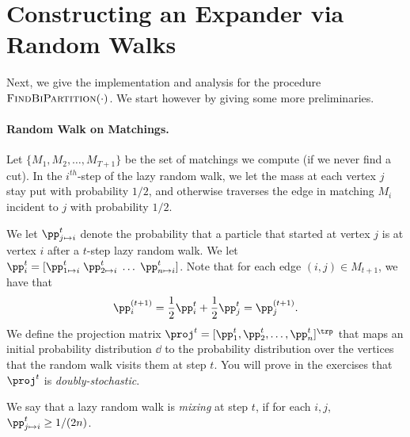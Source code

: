 \section{Constructing an Expander via Random Walks}

Next, we give the implementation and analysis for the procedure $\textsc{FindBiPartition}(\cdot)$. We start however by giving some more preliminaries.

\paragraph{Random Walk on Matchings.} Let $\{M_1, M_2, \dots, M_{T+1}\}$ be the set of matchings we compute (if we never find a cut). In the $i^{th}$-step of the lazy random walk,  we let the mass at each vertex $j$ stay put with probability $1/2$,  and otherwise traverses the edge in matching $M_i$ incident to $j$ with probability $1/2$. 

We let $\pp_{j \mapsto i}^t$ denote the probability that a particle that started at vertex $j$ is at vertex $i$ after a $t$-step lazy random walk. We let $\pp_i^t = [\pp_{1 \mapsto i}^t\; \pp_{2 \mapsto i}^t\; \dots \;\pp_{n \mapsto i}^t]$. Note that for each edge $(i,j) \in M_{t+1}$, we have that 
\[
\pp_i^{(t+1)} = \frac{1}{2} \pp_i^t + \frac{1}{2} \pp_j^t = \pp_j^{(t+1)}.
\]
We define the projection matrix $\proj^t = [\pp_1^{t}, \pp_2^{t}, \dots, \pp_n^{t}]^\trp$ that maps an initial probability distribution $\dd$ to the probability distribution over the vertices that the random walk visits them at step $t$. You will prove in the exercises that $\proj^t$ is \emph{doubly-stochastic}.

We say that a lazy random walk is \emph{mixing} at step $t$, if for each $i,j$, $\pp_{j \mapsto i}^t \geq 1/(2n)$. 

